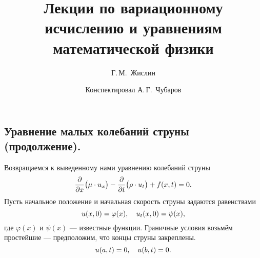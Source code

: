 \documentclass[12pt,a4paper,openany,fleqn]{book}
\newcommand{\pder}[2]{\ensuremath{\frac{\partial#1}{\partial#2}}}
\theoremstyle{definition}
\begin{document}
	\author{Г.\,М.~Жислин}
	\title{Лекции по вариационному исчислению и уравнениям математической физики}
	\date{Конспектировал А.\,Г.~Чубаров}
	
	
	
	\maketitle
	
	
	\renewcommand{\thepart}{\Asbuk{part}}
	\renewcommand{\thechapter}{\arabic{chapter}}
	\renewcommand{\thesection}{\arabic{section}}
	\renewcommand{\thesubsection}{\Roman{subsection}}
	\renewcommand{\thefootnote}{\roman{footnote}}
	\renewcommand{\phi}{\varphi}
	
	\setcounter{chapter}{10}
	\chapter{}
	\label{lecture11}
	\section{Уравнение малых колебаний струны (продолжение).}
	\label{lecture11section1}
	Возвращаемся к выведенному нами уравнению колебаний струны
	\begin{equation}
		\label{l11:eq:1}
		\hfill\pder{}{x}\big(\mu\cdot u_x\big)-\pder{}{t}\big(\rho\cdot u_t\big)+f(x,t)=0.\hfill
	\end{equation}
	Пусть начальное положение и начальная скорость струны задаются равенствами 
	\begin{equation}
		\label{l11:eq:2}
		\hfill u(x,0)=\phi(x),\quad u_t(x,0)=\psi(x),\hfill
	\end{equation} 
	где $\phi(x)$ и $\psi(x)$ --- известные функции. Граничные условия возьмём простейшие --- предположим, что концы струны закреплены.
	\begin{equation}
		\label{l11:eq:3}
		\hfill u(a,t)=0,\quad u(b,t)=0.\hfill
	\end{equation}
\end{document}
